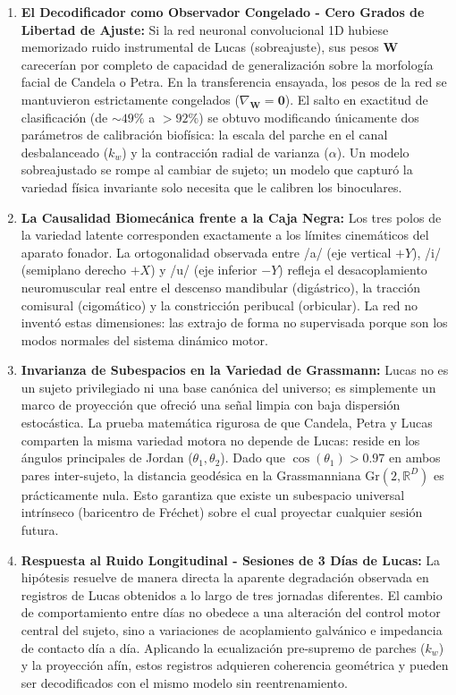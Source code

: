 \documentclass[11pt,a4paper]{article}
\begin{document}
\begin{enumerate}
    \item \textbf{El Decodificador como Observador Congelado - Cero Grados de Libertad de Ajuste:} Si la red neuronal convolucional 1D hubiese memorizado ruido instrumental de Lucas (sobreajuste), sus pesos $\mathbf{W}$ carecerían por completo de capacidad de generalización sobre la morfología facial de Candela o Petra. En la transferencia ensayada, los pesos de la red se mantuvieron estrictamente congelados ($\nabla_{\mathbf{W}} = \mathbf{0}$). El salto en exactitud de clasificación (de $\sim 49\%$ a $>92\%$) se obtuvo modificando únicamente dos parámetros de calibración biofísica: la escala del parche en el canal desbalanceado ($k_w$) y la contracción radial de varianza ($\alpha$). Un modelo sobreajustado se rompe al cambiar de sujeto; un modelo que capturó la variedad física invariante solo necesita que le calibren los binoculares.
    \item \textbf{La Causalidad Biomecánica frente a la Caja Negra:} Los tres polos de la variedad latente corresponden exactamente a los límites cinemáticos del aparato fonador. La ortogonalidad observada entre /a/ (eje vertical $+Y$), /i/ (semiplano derecho $+X$) y /u/ (eje inferior $-Y$) refleja el desacoplamiento neuromuscular real entre el descenso mandibular (digástrico), la tracción comisural (cigomático) y la constricción peribucal (orbicular). La red no inventó estas dimensiones: las extrajo de forma no supervisada porque son los modos normales del sistema dinámico motor.
    \item \textbf{Invarianza de Subespacios en la Variedad de Grassmann:} Lucas no es un sujeto privilegiado ni una base canónica del universo; es simplemente un marco de proyección que ofreció una señal limpia con baja dispersión estocástica. La prueba matemática rigurosa de que Candela, Petra y Lucas comparten la misma variedad motora no depende de Lucas: reside en los ángulos principales de Jordan ($\theta_1, \theta_2$). Dado que $\cos(\theta_1) > 0.97$ en ambos pares inter-sujeto, la distancia geodésica en la Grassmanniana $\text{Gr}(2, \mathbb{R}^D)$ es prácticamente nula. Esto garantiza que existe un subespacio universal intrínseco (baricentro de Fréchet) sobre el cual proyectar cualquier sesión futura.
    \item \textbf{Respuesta al Ruido Longitudinal - Sesiones de 3 Días de Lucas:} La hipótesis resuelve de manera directa la aparente degradación observada en registros de Lucas obtenidos a lo largo de tres jornadas diferentes. El cambio de comportamiento entre días no obedece a una alteración del control motor central del sujeto, sino a variaciones de acoplamiento galvánico e impedancia de contacto día a día. Aplicando la ecualización pre-supremo de parches ($k_w$) y la proyección afín, estos registros adquieren coherencia geométrica y pueden ser decodificados con el mismo modelo sin reentrenamiento.
\end{enumerate}
\end{document}

